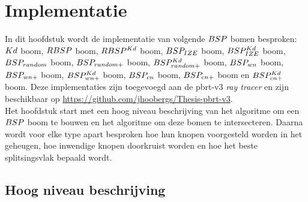 \chapter{Implementatie}
\label{hoofdstuk:implementatie}
In dit hoofdstuk wordt de implementatie van volgende $BSP$ bomen besproken: $Kd$ boom, $RBSP$ boom, $RBSP^{Kd}$ boom, $BSP_{IZE}$ boom, $BSP^{Kd}_{IZE}$ boom, $BSP_{random}$ boom, $BSP_{random+}$ boom, $BSP^{Kd}_{random+}$ boom, $BSP_{wn}$ boom, $BSP_{wn+}$ boom, $BSP^{Kd}_{wn+}$ boom, $BSP_{cn}$ boom, $BSP_{cn+}$ boom en $BSP^{Kd}_{cn+}$ boom.
Deze implementaties zijn toegevoegd aan de pbrt-v3 \textit{ray tracer} \cite{pbrt} en zijn beschikbaar op \url{https://github.com/jhoobergs/Thesis-pbrt-v3}.\\

Het hoofdstuk start met een hoog niveau beschrijving van het algoritme om een $BSP$ boom te bouwen en het algoritme om deze bomen te intersecteren.
Daarna wordt voor elke type apart besproken hoe hun knopen voorgesteld worden in het geheugen, hoe inwendige knopen doorkruist worden en hoe het beste splitsingsvlak bepaald wordt.

\lstset{style=pseudoStyle}

\section{Hoog niveau beschrijving}
\label{sec:h4-hoog-niveau}
